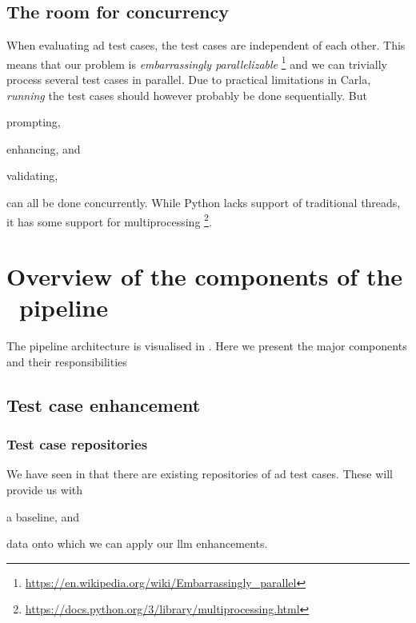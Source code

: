 \subsection{The room for concurrency}

When evaluating \acrshort{ad} test cases, the test cases are independent of each
other. This means that our problem is \textit{embarrassingly parallelizable}
\footnote{\url{https://en.wikipedia.org/wiki/Embarrassingly_parallel}} and we can
trivially process several test cases in parallel. Due to practical limitations
in Carla, \textit{running} the test cases should however probably be done
sequentially. But \begin{inparaenum}
    \item prompting,
    \item enhancing, and
    \item validating,
\end{inparaenum}
can all be done concurrently. While Python lacks support of traditional threads,
it has some support for multiprocessing
\footnote{\url{https://docs.python.org/3/library/multiprocessing.html}}.

\section{Overview of the components of the \hefe~pipeline}

The pipeline architecture is visualised in . Here we
present the major components and their responsibilities


\subsection{Test case enhancement}

\subsubsection{Test case repositories}

We have seen in  that there are existing repositories of
\acrshort{ad} test cases. These will provide us with \begin{inparaenum}
    \item a baseline,
    and
    \item data onto which we can apply our \acrshort{llm} enhancements.
\end{inparaenum}

